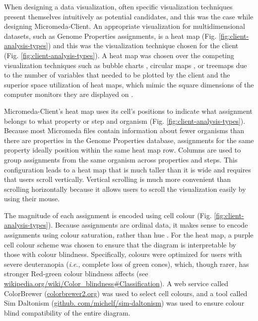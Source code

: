 When designing a data visualization, often specific visualization techniques 
present themselves intuitively as potential candidates, and this was the case 
while designing Micromeda-Client. An appropriate visualization for 
multidimensional datasets, such as Genome Properties assignments, is a heat map 
\cite{wilkinson2009history,tufte2001visual}(Fig. 
\ref{fig:client-analysis-types}) and this was the visualization technique chosen 
for the client (Fig. \ref{fig:client-analysis-types}). A heat map was chosen 
over the competing visualization techniques such as bubble charts 
\cite{tufte2001visual}, circular maps 
\cite{ward2002taxonomy,stothard2004circular}, or treemaps 
\cite{shneiderman1998tree} due to the number of variables that needed to be 
plotted by the client and the superior space utilization of heat maps, which 
mimic the square dimensions of the computer monitors they are displayed on \cite{muramalla2017radial}.

Micromeda-Client's heat map uses its cell's positions to indicate what 
assignment belongs to what property or step and organism (Fig. 
\ref{fig:client-analysis-types}). Because most Micromeda files contain 
information about fewer organisms than there are properties in the Genome 
Properties database, assignments for the same property ideally position within 
the same heat map row. Columns are used to group assignments from the same 
organism across properties and steps. This configuration leads to a heat map 
that is much taller than it is wide and requires that users scroll vertically. 
Vertical scrolling is much more convenient than scrolling horizontally because 
it allows users to scroll the visualization easily by using their mouse.

The magnitude of each assignment is encoded using cell colour (Fig. 
\ref{fig:client-analysis-types}). Because assignments are ordinal data, it makes 
sense to encode assignments using colour saturation, rather than hue 
\cite{munzner2015visualization}. For the heat map, a purple cell colour scheme 
was chosen to ensure that the diagram is interpretable by those with colour 
blindness. Specifically, colours were optimized for users with severe 
deuteranopia (\textit{i}.\textit{e}., complete loss of green cones), which, though rarer, has 
stronger Red-green colour blindness affects (see 
\href{http://wikipedia.org/wiki/Color_blindness#Classification}{wikipedia.org/wiki/Color\_blindness\#Classification}). 
A web service called ColorBrewer 
(\href{http://colorbrewer2.org}{colorbrewer2.org}) was used to select cell 
colours, and a tool called Sim Daltonism 
(\href{http://github.com/michelf/sim-daltonism}{github. 
com/michelf/sim-daltonism}) was used to ensure colour blind compatibility of the 
entire diagram. 

